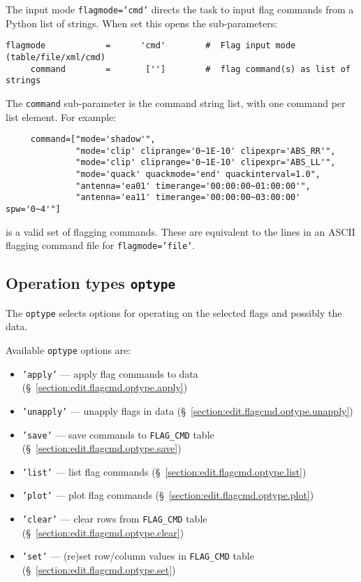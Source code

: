The input mode {\tt flagmode='cmd'} directs the
task to input flag commands from a Python list of strings. 
When set this opens the sub-parameters:
\small
\begin{verbatim}
flagmode            =      'cmd'        #  Flag input mode (table/file/xml/cmd)
     command        =       ['']        #  flag command(s) as list of strings
\end{verbatim}
\normalsize
The {\tt command} sub-parameter is the command string list, with one
command per list element.  For example:
\small
\begin{verbatim}
     command=["mode='shadow'",
              "mode='clip' cliprange='0~1E-10' clipexpr='ABS_RR'",
              "mode='clip' cliprange='0~1E-10' clipexpr='ABS_LL'",
              "mode='quack' quackmode='end' quackinterval=1.0",
              "antenna='ea01' timerange='00:00:00~01:00:00'",
              "antenna='ea11' timerange='00:00:00~03:00:00' spw='0~4'"]
\end{verbatim}
\normalsize
is a valid set of flagging commands.  These are equivalent to the
lines in an ASCII flagging command file for {\tt flagmode='file'}.

\subsection{Operation types {\tt optype}}
\label{section:edit.flagcmd.optype}

The {\tt optype} selects options for operating on the selected
flags and possibly the data.

Available {\tt optype} options are:
\begin{itemize}
   \item {\tt 'apply'} --- apply flag commands to data (\S~\ref{section:edit.flagcmd.optype.apply})
   \item {\tt 'unapply'} --- unapply flags in data (\S~\ref{section:edit.flagcmd.optype.unapply})
   \item {\tt 'save'} --- save commands to {\tt FLAG\_CMD} table (\S~\ref{section:edit.flagcmd.optype.save})
   \item {\tt 'list'} --- list flag commands (\S~\ref{section:edit.flagcmd.optype.list})
   \item {\tt 'plot'} --- plot flag commands (\S~\ref{section:edit.flagcmd.optype.plot})
   \item {\tt 'clear'} --- clear rows from {\tt FLAG\_CMD} table (\S~\ref{section:edit.flagcmd.optype.clear})
   \item {\tt 'set'} --- (re)set row/column values in {\tt FLAG\_CMD} table (\S~\ref{section:edit.flagcmd.optype.set})
\end{itemize}

